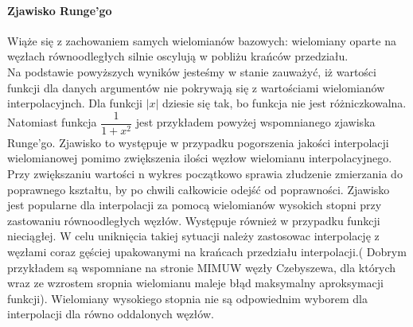 \documentclass[11pt]{article}
\begin{document}
\begin{flushleft}
\paragraph{Zjawisko Runge'go}
Wiąże się z zachowaniem  samych wielomianów bazowych: wielomiany oparte na węzłach równoodległych silnie oscylują w pobliżu krańców przedziału.\\
Na podstawie powyższych wyników jesteśmy w stanie zauważyć, iż wartości funkcji dla danych argumentów nie pokrywają się z wartościami wielomianów interpolacyjnch. Dla funkcji $|x|$ dziesie się tak, bo funkcja nie jest różniczkowalna. Natomiast funkcja $\dfrac{1}{1+x^2}$ jest przykładem powyżej wspomnianego zjawiska Runge'go. Zjawisko to występuje w przypadku pogorszenia jakości interpolacji wielomianowej pomimo zwiększenia ilości węzłow wielomianu interpolacyjnego. Przy zwiększaniu wartości n wykres początkowo sprawia złudzenie zmierzania do poprawnego kształtu, by po chwili całkowicie odejść od poprawności. Zjawisko jest popularne dla interpolacji za pomocą wielomianów wysokich stopni przy zastowaniu równoodległych węzłów. Występuje również w przypadku funkcji nieciągłej. W celu uniknięcia takiej sytuacji należy zastosowac interpolację z węzłami coraz gęściej upakowanymi na krańcach przedziału interpolacji.( Dobrym przykładem są wspomniane na stronie MIMUW węzły Czebyszewa, dla których wraz ze wzrostem sropnia wielomianu maleje błąd maksymalny aproksymacji funkcji). Wielomiany wysokiego stopnia nie są odpowiednim wyborem dla interpolacji dla równo oddalonych węzłów.
\end{flushleft}
\end{document}

